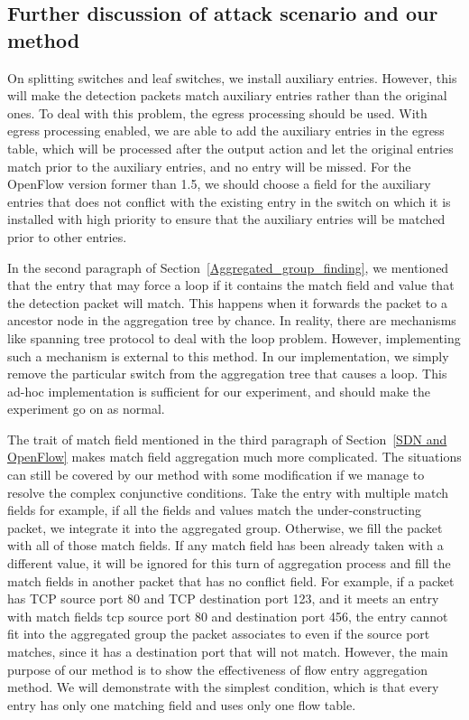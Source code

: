 \subsection{Further discussion of attack scenario and our method}
\label{Further_discussion}
On splitting switches and leaf switches, we install auxiliary entries. However, this will make the detection packets match auxiliary entries rather than the original ones. To deal with this problem, the egress processing should be used. With egress processing enabled, we are able to add the auxiliary entries in the egress table, which will be processed after the output action and let the original entries match prior to the auxiliary entries, and no entry will be missed. For the OpenFlow version former than 1.5, we should choose a field for the auxiliary entries that does not conflict with the existing entry in the switch on which it is installed with high priority to ensure that the auxiliary entries will be matched prior to other entries.

In the second paragraph of Section~\ref{Aggregated_group_finding}, we mentioned that the entry that may force a loop if it contains the match field and value that the detection packet will match. This happens when it forwards the packet to a ancestor node in the aggregation tree by chance. In reality, there are mechanisms like spanning tree protocol to deal with the loop problem. However, implementing such a mechanism is external to this method. In our implementation, we simply remove the particular switch from the aggregation tree that causes a loop. This ad-hoc implementation is sufficient for our experiment, and should make the experiment go on as normal.

The trait of match field mentioned in the third paragraph of Section~\ref{SDN and OpenFlow} makes match field aggregation much more complicated. The situations can still be covered by our method with some modification if we manage to resolve the complex conjunctive conditions. Take the entry with multiple match fields for example, if all the fields and values match the under-constructing packet, we integrate it into the aggregated group. Otherwise, we fill the packet with all of those match fields. If any match field has been already taken with a different value, it will be ignored for this turn of aggregation process and fill the match fields in another packet that has no conflict field. For example, if a packet has TCP source port 80 and TCP destination port 123, and it meets an entry with match fields tcp source port 80 and destination port 456, the entry cannot fit into the aggregated group the packet associates to even if the source port matches, since it has a destination port that will not match. However, the main purpose of our method is to show the effectiveness of flow entry aggregation method. We will demonstrate with the simplest condition, which is that every entry has only one matching field and uses only one flow table.

